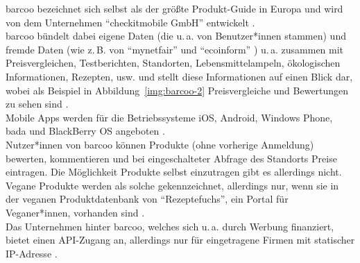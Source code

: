 barcoo bezeichnet sich selbst als der größte Produkt-Guide in Europa
und wird von dem Unternehmen "`checkitmobile GmbH"'
entwickelt .\\
barcoo bündelt dabei eigene Daten (die
u.\,a. von Benutzer*innen
stammen) und fremde Daten (wie z.\,B. von "`mynetfair"' und
"`ecoinform"' )
u.\,a. zusammen mit Preisvergleichen, Testberichten, Standorten,
Lebensmittelampeln, ökologischen Informationen, Rezepten, usw. und
stellt diese Informationen auf einen Blick dar, wobei als Beispiel in
Abbildung~\ref{img:barcoo-2} Preisvergleiche und Bewertungen zu sehen
sind .\\
Mobile Apps werden für die Betriebssysteme iOS, Android,
Windows Phone, bada und BlackBerry OS angeboten
.\\
Nutzer*innen von barcoo können Produkte (ohne vorherige Anmeldung)
bewerten, kommentieren und bei
eingeschalteter Abfrage des Standorts Preise eintragen. Die
Möglichkeit Produkte selbst einzutragen gibt es allerdings nicht.\\
Vegane Produkte werden als solche gekennzeichnet, allerdings nur, wenn
sie in der veganen Produktdatenbank von "`Rezeptefuchs"', ein Portal für
Veganer*innen, vorhanden sind .\\
Das Unternehmen hinter barcoo, welches sich u.\,a. durch Werbung
finanziert, bietet einen \ac{API}-Zugang an,
allerdings nur für eingetragene Firmen mit statischer IP-Adresse
.

